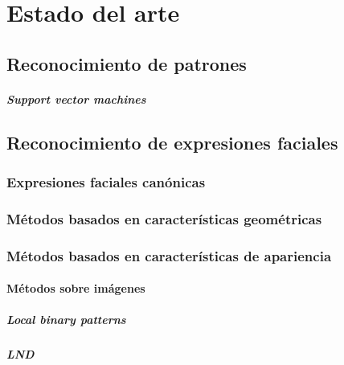 \chapter[Estado del arte]{Estado del arte}
\label{ch:estado_del_arte}

\section{Reconocimiento de patrones}
\label{sec:rec_patrones}
	\paragraph{Support vector machines}
	\label{sec:svm}

\section{Reconocimiento de expresiones faciales}
\label{sec:fer}

\subsection{Expresiones faciales canónicas}
\label{sec:type_fe}

\subsection{Métodos basados en características geométricas}
\label{sec:met_geo}

\subsection{Métodos basados en características de apariencia}
\label{sec:met_apa}

	\subsubsection{Métodos sobre imágenes}
	\label{sec:met_imagen}

		\paragraph{Local binary patterns}
		\label{sec:lbp}

		\paragraph{LND}
		\label{sec:lnd}

